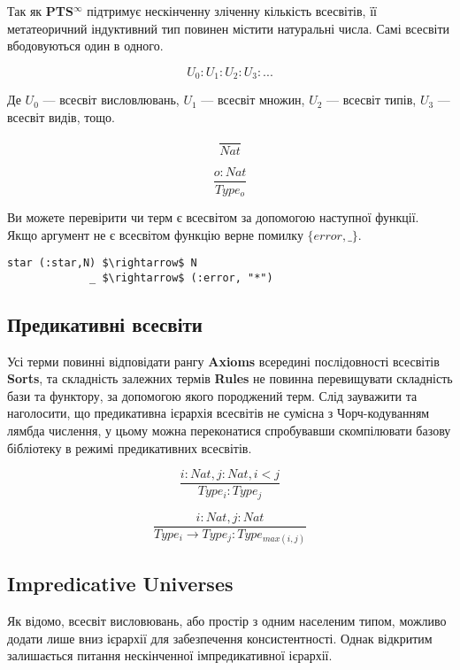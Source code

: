 \documentclass{article}
\begin{document}
Так як \textbf{PTS$^\infty$} підтримує нескінченну зліченну кількість всесвітів, її метатеоричний
індуктивний тип повинен містити натуральні числа. Самі всесвіти вбодовуються один в одного.

$$
U_0 : U_1 : U_2 : U_3 : ...
$$

Де $U_0$ --- всесвіт висловлювань, $U_1$ --- всесвіт множин, $U_2$ --- всесвіт типів, $U_3$ --- всесвіт видів, тощо.

\begin{equation}
\tag{I}
\dfrac
{}
{Nat}
\end{equation}

\begin{equation}
\tag{S}
\dfrac
{o : Nat}
{Type_o}
\end{equation}

Ви можете перевірити чи терм є всесвітом за допомогою наступної функції. Якщо аргумент не є всесвітом функцію верне помилку  $\{error,\_\}$.

\begin{lstlisting}[mathescape=true]
star (:star,N) $\rightarrow$ N
             _ $\rightarrow$ (:error, "*")
\end{lstlisting}

\subsection{Предикативні всесвіти}

Усі терми повинні відповідати рангу {\bf Axioms} всередині послідовності всесвітів {\bf Sorts}, та складність залежних
термів {\bf Rules} не повинна перевищувати складність бази та функтору, за допомогою якого породжений терм.
Слід зауважити та наголосити, що предикативна ієрархія всесвітів не сумісна з Чорч-кодуванням лямбда числення, у цьому можна
переконатися спробувавши скомпілювати базову бібліотеку в режимі предикативних всесвітів.

\[
\tag{$A_1$}
\dfrac{i: Nat, j: Nat, i < j}{Type_i : Type_j}
\]

\[
\tag{$R_1$}
\dfrac{i : Nat, j : Nat}{Type_i \rightarrow Type_j : Type_{max(i,j)} }
\]

\subsection{Impredicative Universes}

Як відомо, всесвіт висловювань, або простір з одним населеним типом, можливо додати лише вниз ієрархії для забезпечення консистентності.
Однак відкритим залишається питання нескінченної імпредикативної ієрархії.
\end{document}
